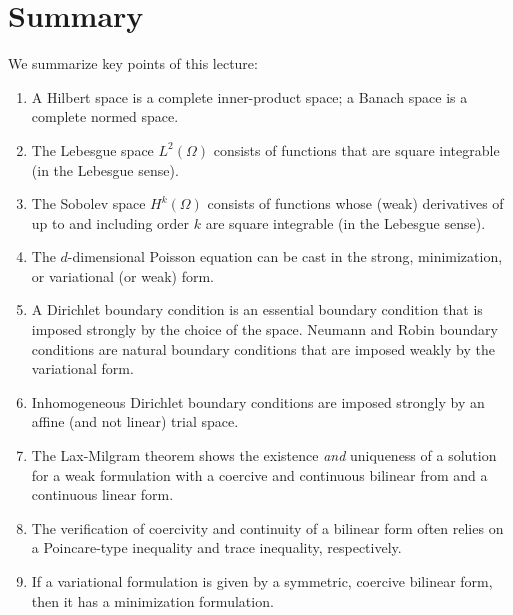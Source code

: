 \section{Summary}
We summarize key points of this lecture:
\begin{enumerate}
\item A Hilbert space is a complete inner-product space; a Banach space is a complete normed space.
\item The Lebesgue space $L^2(\Omega)$ consists of functions that are square integrable (in the Lebesgue sense).
\item The Sobolev space $H^k(\Omega)$ consists of functions whose (weak) derivatives of up to and including order $k$ are square integrable (in the Lebesgue sense).
\item The $d$-dimensional Poisson equation can be cast in the strong, minimization, or variational (or weak) form.
\item A Dirichlet boundary condition is an essential boundary condition that is imposed strongly by the choice of the space.  Neumann and Robin boundary conditions are natural boundary conditions that are imposed weakly by the variational form.
\item Inhomogeneous Dirichlet boundary conditions are imposed strongly by an affine (and not linear) trial space.
\item The Lax-Milgram theorem shows the existence \emph{and} uniqueness of a solution for a weak formulation with a coercive and continuous bilinear from and a continuous linear form.
\item The verification of coercivity and continuity of a bilinear form often relies on a Poincare-type inequality and trace inequality, respectively.
\item If a variational formulation is given by a symmetric, coercive bilinear form, then it has a minimization formulation.
\end{enumerate}



